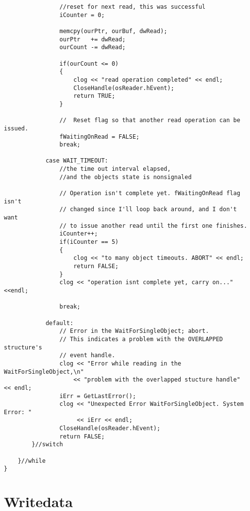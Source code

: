 \begin{lstlisting}
				//reset for next read, this was successful
				iCounter = 0;
				
				memcpy(ourPtr, ourBuf, dwRead);
				ourPtr   += dwRead;
				ourCount -= dwRead;
					
				if(ourCount <= 0) 
				{
					clog << "read operation completed" << endl;
					CloseHandle(osReader.hEvent);
					return TRUE;
				}

				//  Reset flag so that another read operation can be issued.
				fWaitingOnRead = FALSE;
				break;

			case WAIT_TIMEOUT:
				//the time out interval elapsed,
				//and the objects state is nonsignaled

				// Operation isn't complete yet. fWaitingOnRead flag isn't
				// changed since I'll loop back around, and I don't want
				// to issue another read until the first one finishes.
				iCounter++;
				if(iCounter == 5)
				{
					clog << "to many object timeouts. ABORT" << endl;
					return FALSE;
				}
				clog << "operation isnt complete yet, carry on..."<<endl;

				break;                       

			default:
				// Error in the WaitForSingleObject; abort.
				// This indicates a problem with the OVERLAPPED structure's
				// event handle.
				clog << "Error while reading in the WaitForSingleObject,\n"
					<< "problem with the overlapped stucture handle" << endl;
				iErr = GetLastError();
				clog << "Unexpected Error WaitForSingleObject. System Error: "
				     << iErr << endl;
				CloseHandle(osReader.hEvent);
				return FALSE;
		}//switch

	}//while
}
\end{lstlisting}

\section{Writedata}\label{WriteDataCode}

